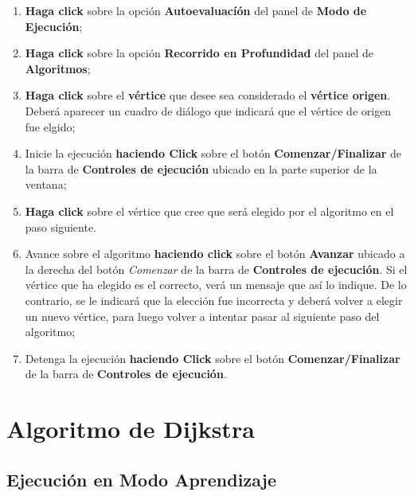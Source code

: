 \documentclass{book}
\begin{document}
\begin{enumerate}
	\itemsep=8pt \topsep=0pt \partopsep=0pt \parskip=0pt \parsep=0pt

	\item \textbf{Haga click} sobre la opción \textbf{Autoevaluacíón} del panel de \textbf{Modo de Ejecución};

	\item \textbf{Haga click} sobre la opción \textbf{Recorrido en Profundidad} del panel de \textbf{Algoritmos};

	\item \textbf{Haga click} sobre el \textbf{vértice} que desee sea considerado el \textbf{vértice origen}. Deberá aparecer un cuadro de diálogo que indicará que el vértice de origen fue elgido;

	\item Inicie la ejecución \textbf{haciendo Click} sobre el botón \textbf{Comenzar/Finalizar} de la barra de \textbf{Controles de ejecución} ubicado en la parte superior de la ventana;

	\item \textbf{Haga click} sobre el vértice que cree que será elegido por el algoritmo en el paso siguiente.

	\item Avance sobre el algoritmo \textbf{haciendo click} sobre el botón \textbf{Avanzar} ubicado a la derecha del botón \textit{Comenzar} de la barra de \textbf{Controles de ejecución}. Si el vértice que ha elegido es el correcto, verá un mensaje que así lo indique. De lo contrario, se le indicará que la elección fue incorrecta y deberá volver a elegir un nuevo vértice, para luego volver a intentar pasar al siguiente paso del algoritmo;

	\item Detenga la ejecución \textbf{haciendo Click} sobre el botón \textbf{Comenzar/Finalizar} de la barra de \textbf{Controles de ejecución}.

\end{enumerate}
\medskip





%
%
\chapter{Algoritmo de Dijkstra}


\section{Ejecución en Modo Aprendizaje}
\end{document}
